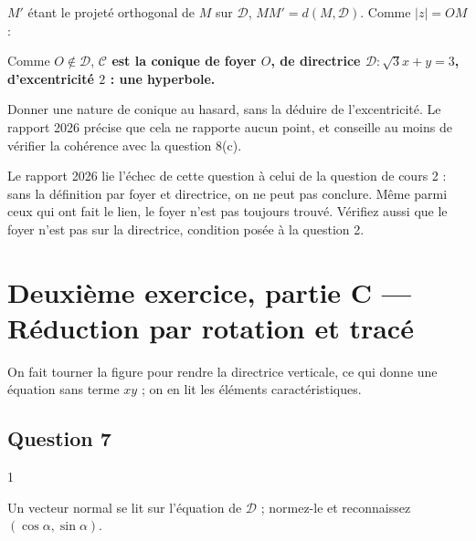 \documentclass[11pt,a4paper]{article}
\newcommand{\equationajustee}[1]{%
  \sbox{\boiteequation}{$\displaystyle #1$}%
  \ifdim\wd\boiteequation>\linewidth
    \[\resizebox{\linewidth}{!}{\usebox{\boiteequation}}\]%
  \else
    \[#1\]%
  \fi}
\begin{document}
\(M'\) étant le projeté orthogonal de \(M\) sur \(\mathcal{D}\), \(MM'=d(M,\mathcal{D})\). Comme \(|z|=OM\) :

\equationajustee{M\in\mathcal{C}\iff OM=2\,d(M,\mathcal{D}).}

Comme \(O\notin\mathcal{D}\), \textbf{\(\mathcal{C}\) est la conique de foyer \(O\), de directrice \(\mathcal{D}:\sqrt3x+y=3\), d'excentricité \(2\) : une hyperbole.}

\begin{piege}

Donner une nature de conique au hasard, sans la déduire de l'excentricité. Le rapport 2026 précise que cela ne rapporte aucun point, et conseille au moins de vérifier la cohérence avec la question 8(c).

\end{piege}

\begin{jury}

Le rapport 2026 lie l'échec de cette question à celui de la question de cours 2 : sans la définition par foyer et directrice, on ne peut pas conclure. Même parmi ceux qui ont fait le lien, le foyer n'est pas toujours trouvé. Vérifiez aussi que le foyer n'est pas sur la directrice, condition posée à la question 2.

\end{jury}

\hypertarget{deuxiuxe8me-exercice-partie-c-ruxe9duction-par-rotation-et-tracuxe9}{%
\section{Deuxième exercice, partie C --- Réduction par rotation et tracé}\label{deuxiuxe8me-exercice-partie-c-ruxe9duction-par-rotation-et-tracuxe9}}

On fait tourner la figure pour rendre la directrice verticale, ce qui donne une équation sans terme \(xy\) ; on en lit les éléments caractéristiques.

\hypertarget{question-7-1}{%
\subsection{Question 7}\label{question-7-1}}

\begin{indication}{1}

Un vecteur normal se lit sur l'équation de \(\mathcal{D}\) ; normez-le et reconnaissez \((\cos\alpha,\sin\alpha)\).

\end{indication}
\end{document}
